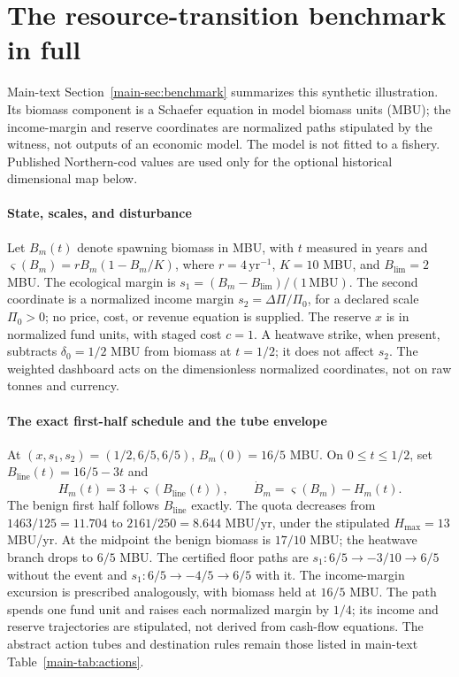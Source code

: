 \section{The resource-transition benchmark in full}\label{si:benchmark}

Main-text Section~\ref{main-sec:benchmark} summarizes this synthetic illustration. Its biomass component is a Schaefer equation in model biomass units (MBU); the income-margin and reserve coordinates are normalized paths stipulated by the witness, not outputs of an economic model. The model is not fitted to a fishery. Published Northern-cod values are used only for the optional historical dimensional map below.

\paragraph{State, scales, and disturbance} Let $B_m(t)$ denote spawning biomass in MBU, with $t$ measured in years and $\varsigma(B_m)=rB_m(1-B_m/K)$, where $r=4\,\mathrm{yr}^{-1}$, $K=10$ MBU, and $B_{\mathrm{lim}}=2$ MBU. The ecological margin is $s_1=(B_m-B_{\mathrm{lim}})/(1\,\mathrm{MBU})$. The second coordinate is a normalized income margin $s_2=\Delta\Pi/\Pi_0$, for a declared scale $\Pi_0>0$; no price, cost, or revenue equation is supplied. The reserve $x$ is in normalized fund units, with staged cost $c=1$. A heatwave strike, when present, subtracts $\delta_0=1/2$ MBU from biomass at $t=1/2$; it does not affect $s_2$. The weighted dashboard acts on the dimensionless normalized coordinates, not on raw tonnes and currency.

\paragraph{The exact first-half schedule and the tube envelope} At $(x,s_1,s_2)=(1/2,6/5,6/5)$, $B_m(0)=16/5$ MBU. On $0\le t\le1/2$, set $B_{\mathrm{line}}(t)=16/5-3t$ and
\[
H_m(t)=3+\varsigma(B_{\mathrm{line}}(t)),\qquad \dot B_m=\varsigma(B_m)-H_m(t).
\]
The benign first half follows $B_{\mathrm{line}}$ exactly. The quota decreases from $1463/125=11.704$ to $2161/250=8.644$ MBU/yr, under the stipulated $H_{\max}=13$ MBU/yr. At the midpoint the benign biomass is $17/10$ MBU; the heatwave branch drops to $6/5$ MBU. The certified floor paths are $s_1:6/5\to-3/10\to6/5$ without the event and $s_1:6/5\to-4/5\to6/5$ with it. The  income-margin excursion is prescribed analogously, with biomass held at $16/5$ MBU. The  path spends one fund unit and raises each normalized margin by $1/4$; its income and reserve trajectories are stipulated, not derived from cash-flow equations. The abstract action tubes and destination rules remain those listed in main-text Table~\ref{main-tab:actions}.

